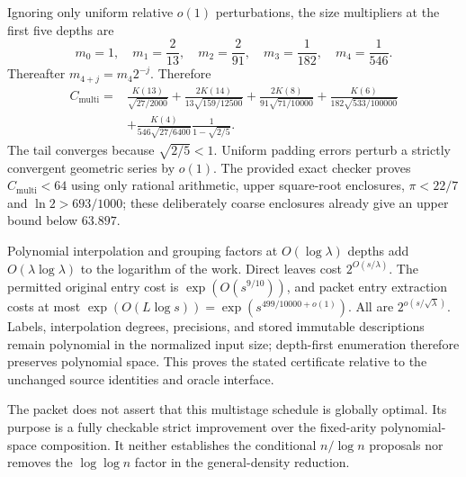 Ignoring only uniform relative $o(1)$ perturbations, the size multipliers
at the first five depths are
\[
 m_0=1,\quad m_1=\frac2{13},\quad m_2=\frac2{91},
 \quad m_3=\frac1{182},\quad m_4=\frac1{546}.
\]
Thereafter $m_{4+j}=m_4 2^{-j}$.  Therefore
\begin{align*}
 C_{\mathrm{multi}}={}&
 \frac{K(13)}{\sqrt{27/2000}}
 +\frac{2K(14)}{13\sqrt{159/12500}}
 +\frac{2K(8)}{91\sqrt{71/10000}}
 +\frac{K(6)}{182\sqrt{533/100000}}\\
 &+\frac{K(4)}{546\sqrt{27/6400}}
       \frac1{1-\sqrt{2/5}}.
\end{align*}
The tail converges because $\sqrt{2/5}<1$.  Uniform padding errors
perturb a strictly convergent geometric series by $o(1)$.
The provided exact checker proves $C_{\mathrm{multi}}<64$ using only
rational arithmetic, upper square-root enclosures, $\pi<22/7$ and
$\ln2>693/1000$; these deliberately coarse enclosures already give an
upper bound below $63.897$.

Polynomial interpolation and grouping factors at $O(\log\lambda)$
depths add $O(\lambda\log\lambda)$ to the logarithm of the work.
Direct leaves cost $2^{O(s/\lambda)}$.  The permitted original entry
cost is $\exp(O(s^{9/10}))$, and packet entry extraction costs at most
$\exp(O(L\log s))=\exp(s^{499/10000+o(1)})$.  All are
$2^{o(s/\sqrt\lambda)}$.  Labels, interpolation degrees, precisions,
and stored immutable descriptions remain polynomial in the normalized
input size; depth-first enumeration therefore preserves polynomial
space.  This proves the stated certificate relative to the unchanged
source identities and oracle interface.

The packet does not assert that this multistage schedule is globally
optimal.  Its purpose is a fully checkable strict improvement over the
fixed-arity polynomial-space composition.  It neither establishes the
conditional $n/\log n$ proposals nor removes the $\log\log n$ factor
in the general-density reduction.
